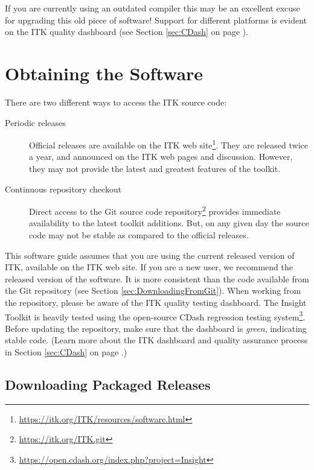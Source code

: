 If you are currently using an outdated compiler this may be an excellent excuse
for upgrading this old piece of software! Support for different platforms is
evident on the ITK quality dashboard (see Section \ref{sec:CDash} on page
\pageref{sec:CDash}).

\section{Obtaining the Software}
\label{sec:ObtainingTheSoftware}
\label{sec:DownloadingITK}

There are two different ways to access the ITK source code:
\begin{description}
  \item[Periodic releases]{Official releases are available on the ITK web
    site\footnote{\url{https://itk.org/ITK/resources/software.html}}.
    They are released twice a year,
    and announced on the ITK web pages and discussion.
    However, they may not provide the latest and greatest features of the
    toolkit.}
  \item[Continuous repository checkout]{Direct access to the Git source code
    repository\footnote{\url{https://itk.org/ITK.git}} provides immediate
    availability to the latest toolkit additions. But, on any given day the
    source code may not be stable as compared to the official releases.}
\end{description}

This software guide assumes that you are using the current released version of
ITK, available on the ITK web site. If you are a new user, we recommend the
released version of the software. It is more consistent
than the code available from the Git repository (see Section
\ref{sec:DownloadingFromGit}).  When working from the
repository, please be aware of the ITK quality testing dashboard. The Insight
Toolkit is heavily tested using the open-source CDash regression testing
system\footnote{\url{https://open.cdash.org/index.php?project=Insight}}. Before
updating the repository, make sure that the dashboard is \emph{green},
indicating stable code. (Learn more about the ITK dashboard and quality
assurance process in Section \ref{sec:CDash} on page \pageref{sec:CDash}.)

\subsection{Downloading Packaged Releases}
\label{sec:DownloadingReleases}

